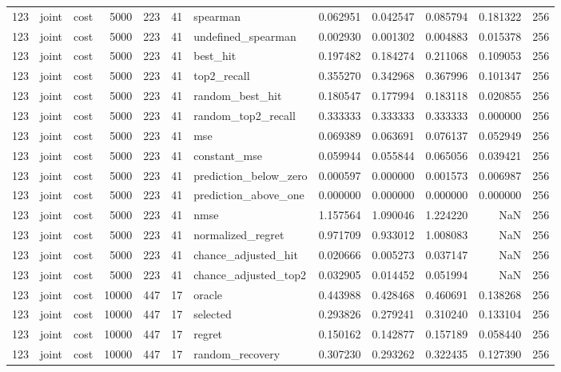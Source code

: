 \begin{tabular}{rllrrrlrrrrr}
123 & joint & cost & 5000 & 223 & 41 & spearman & 0.062951 & 0.042547 & 0.085794 & 0.181322 & 256 \\
123 & joint & cost & 5000 & 223 & 41 & undefined_spearman & 0.002930 & 0.001302 & 0.004883 & 0.015378 & 256 \\
123 & joint & cost & 5000 & 223 & 41 & best_hit & 0.197482 & 0.184274 & 0.211068 & 0.109053 & 256 \\
123 & joint & cost & 5000 & 223 & 41 & top2_recall & 0.355270 & 0.342968 & 0.367996 & 0.101347 & 256 \\
123 & joint & cost & 5000 & 223 & 41 & random_best_hit & 0.180547 & 0.177994 & 0.183118 & 0.020855 & 256 \\
123 & joint & cost & 5000 & 223 & 41 & random_top2_recall & 0.333333 & 0.333333 & 0.333333 & 0.000000 & 256 \\
123 & joint & cost & 5000 & 223 & 41 & mse & 0.069389 & 0.063691 & 0.076137 & 0.052949 & 256 \\
123 & joint & cost & 5000 & 223 & 41 & constant_mse & 0.059944 & 0.055844 & 0.065056 & 0.039421 & 256 \\
123 & joint & cost & 5000 & 223 & 41 & prediction_below_zero & 0.000597 & 0.000000 & 0.001573 & 0.006987 & 256 \\
123 & joint & cost & 5000 & 223 & 41 & prediction_above_one & 0.000000 & 0.000000 & 0.000000 & 0.000000 & 256 \\
123 & joint & cost & 5000 & 223 & 41 & nmse & 1.157564 & 1.090046 & 1.224220 & NaN & 256 \\
123 & joint & cost & 5000 & 223 & 41 & normalized_regret & 0.971709 & 0.933012 & 1.008083 & NaN & 256 \\
123 & joint & cost & 5000 & 223 & 41 & chance_adjusted_hit & 0.020666 & 0.005273 & 0.037147 & NaN & 256 \\
123 & joint & cost & 5000 & 223 & 41 & chance_adjusted_top2 & 0.032905 & 0.014452 & 0.051994 & NaN & 256 \\
123 & joint & cost & 10000 & 447 & 17 & oracle & 0.443988 & 0.428468 & 0.460691 & 0.138268 & 256 \\
123 & joint & cost & 10000 & 447 & 17 & selected & 0.293826 & 0.279241 & 0.310240 & 0.133104 & 256 \\
123 & joint & cost & 10000 & 447 & 17 & regret & 0.150162 & 0.142877 & 0.157189 & 0.058440 & 256 \\
123 & joint & cost & 10000 & 447 & 17 & random_recovery & 0.307230 & 0.293262 & 0.322435 & 0.127390 & 256 \\

\end{tabular}
